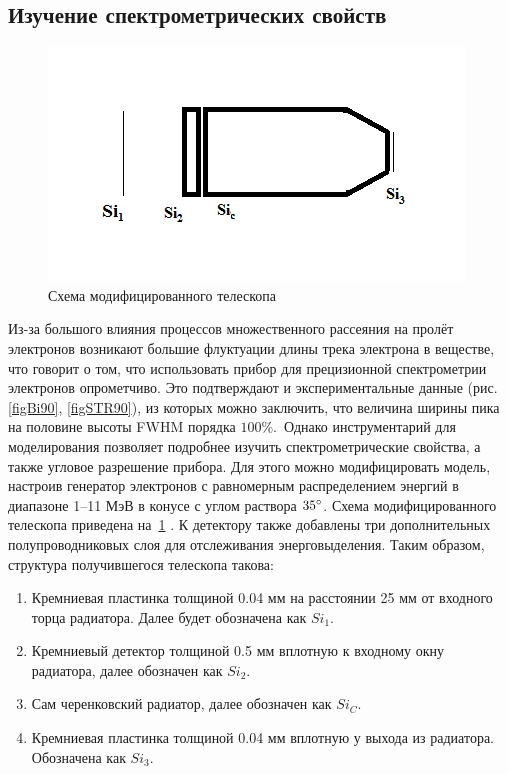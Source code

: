 \documentclass[12pt,a4paper]{report} %
\begin{document}
\subsection{Изучение спектрометрических свойств}
\begin{figure}[h!]
\begin{center}
	\includegraphics[width=.9\textwidth]{pictures/schemem.png}
	\caption{Схема модифицированного телескопа}
	\label{pic:zhut}
\end{center}
\end{figure}
Из-за большого влияния процессов множественного рассеяния на пролёт электронов возникают большие флуктуации длины трека электрона в веществе, что говорит о том, что использовать прибор для прецизионной спектрометрии электронов опрометчиво. Это подтверждают и экспериментальные данные (рис. \ref{figBi90}, \ref{figSTR90}), из которых можно заключить, что величина ширины пика на половине высоты FWHM порядка $100\%$.~Однако инструментарий для моделирования позволяет подробнее изучить спектрометрические свойства, а также угловое разрешение прибора. Для этого можно модифицировать модель, настроив генератор электронов с равномерным распределением энергий в диапазоне  1--11 МэВ в конусе с углом раствора $35\degree$. Схема модифицированного телескопа приведена на~\ref{pic:zhut} \afterpage{\clearpage} .
К детектору также добавлены три дополнительных полупроводниковых слоя для отслеживания энерговыделения. Таким образом, структура получившегося телескопа такова:
\begin{enumerate}
	\item Кремниевая пластинка толщиной 0.04 мм на расстоянии 25 мм от входного торца радиатора. Далее будет обозначена как $Si_1$.
	\item Кремниевый детектор толщиной 0.5 мм вплотную к входному окну радиатора, далее обозначен как $Si_2$.
	\item Сам черенковский радиатор, далее обозначен как $Si_C$.
	\item Кремниевая пластинка толщиной 0.04 мм вплотную у выхода из радиатора. Обозначена как $Si_3$.
\end{enumerate}
\end{document}
